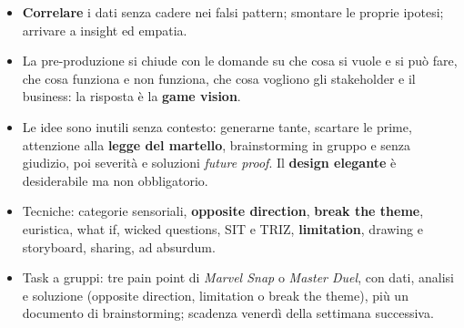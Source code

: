 \begin{itemize}
        (action, social, mastery, achievement, immersion, creativity), ognuna
        uno spettro; si descrive un gioco con le \textbf{dominanti}. L'unico
        \emph{fun} ammesso è quello delle quattro chiavi di Lazzaro.
  \item \textbf{Correlare} i dati senza cadere nei falsi pattern; smontare le
        proprie ipotesi; arrivare a insight ed empatia.
  \item La pre-produzione si chiude con le domande su che cosa si vuole e si
        può fare, che cosa funziona e non funziona, che cosa vogliono gli
        stakeholder e il business: la risposta è la \textbf{game vision}.
  \item Le idee sono inutili senza contesto: generarne tante, scartare le
        prime, attenzione alla \textbf{legge del martello}, brainstorming in
        gruppo e senza giudizio, poi severità e soluzioni \emph{future
        proof}. Il \textbf{design elegante} è desiderabile ma non obbligatorio.
  \item Tecniche: categorie sensoriali, \textbf{opposite direction},
        \textbf{break the theme}, euristica, what if, wicked questions, SIT e
        TRIZ, \textbf{limitation}, drawing e storyboard, sharing, ad absurdum.
  \item Task a gruppi: tre pain point di \emph{Marvel Snap} o \emph{Master
        Duel}, con dati, analisi e soluzione (opposite direction, limitation o
        break the theme), più un documento di brainstorming; scadenza venerdì
        della settimana successiva.
\end{itemize}
